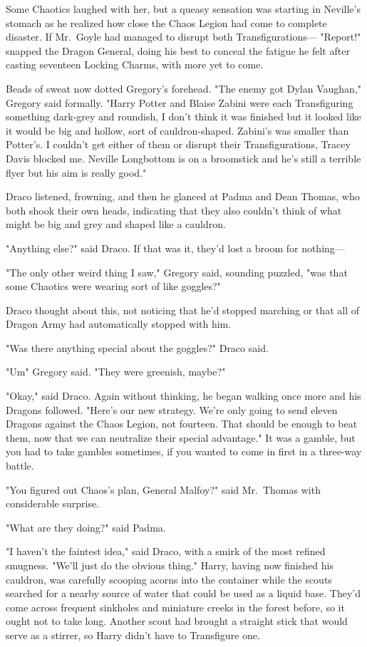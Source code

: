 Some Chaotics laughed with her, but a queasy sensation was starting in
Neville's stomach as he realized how close the Chaos Legion had come to
complete disaster. If Mr.~Goyle had managed to disrupt both Transfigurations—
\sbreak
"Report!" snapped the Dragon General, doing his best to conceal the fatigue he
felt after casting seventeen Locking Charms, with more yet to come.

Beads of sweat now dotted Gregory's forehead. "The enemy got Dylan Vaughan,"
Gregory said formally. "Harry Potter and Blaise Zabini were each Transfiguring
something dark-grey and roundish, I don't think it was finished but it looked
like it would be big and hollow, sort of cauldron-shaped. Zabini's was smaller
than Potter's. I couldn't get either of them or disrupt their Transfigurations,
Tracey Davis blocked me. Neville Longbottom is on a broomstick and he's still a
terrible flyer but his aim is really good."

Draco listened, frowning, and then he glanced at Padma and Dean Thomas, who
both shook their own heads, indicating that they also couldn't think of what
might be big and grey and shaped like a cauldron.

"Anything else?" said Draco. If that was it, they'd lost a broom for nothing—

"The only other weird thing I saw," Gregory said, sounding puzzled, "was that
some Chaotics were wearing{\el} sort of like goggles?"

Draco thought about this, not noticing that he'd stopped marching or that all
of Dragon Army had automatically stopped with him.

"Was there anything special about the goggles?" Draco said.

"Um{\el}" Gregory said. "They were{\el} greenish, maybe?"

"Okay," said Draco. Again without thinking, he began walking once more and his
Dragons followed. "Here's our new strategy. We're only going to send eleven
Dragons against the Chaos Legion, not fourteen. That should be enough to beat
them, now that we can neutralize their special advantage." It was a gamble, but
you had to take gambles sometimes, if you wanted to come in first in a
three-way battle.

"You figured out Chaos's plan, General Malfoy?" said Mr.~Thomas with
considerable surprise.

"What are they doing?" said Padma.

"I haven't the faintest idea," said Draco, with a smirk of the most refined
smugness. "We'll just do the obvious thing."
\sbreak
Harry, having now finished his cauldron, was carefully scooping acorns into the
container while the scouts searched for a nearby source of water that could be
used as a liquid base. They'd come across frequent sinkholes and miniature
creeks in the forest before, so it ought not to take long. Another scout had
brought a straight stick that would serve as a stirrer, so Harry didn't have to
Transfigure one.

